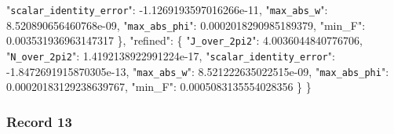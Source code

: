 \documentclass[
  10pt,
]{article}
\newenvironment{Shaded}{}{}
\newcommand{\DataTypeTok}[1]{\textcolor[rgb]{0.56,0.13,0.00}{#1}}
\newcommand{\FloatTok}[1]{\textcolor[rgb]{0.25,0.63,0.44}{#1}}
\newcommand{\FunctionTok}[1]{\textcolor[rgb]{0.02,0.16,0.49}{#1}}
\begin{document}
\begin{Shaded}
\begin{Highlighting}[]
    \DataTypeTok{"\nolinkurl{scalar_identity_error}"}\FunctionTok{:} \FloatTok{{-}1.1269193597016266e{-}11}\FunctionTok{,}
    \DataTypeTok{"\nolinkurl{max_abs_w}"}\FunctionTok{:} \FloatTok{8.520890656460768e{-}09}\FunctionTok{,}
    \DataTypeTok{"\nolinkurl{max_abs_phi}"}\FunctionTok{:} \FloatTok{0.0002018290985189379}\FunctionTok{,}
    \DataTypeTok{"min\_F"}\FunctionTok{:} \FloatTok{0.003531936963147317}
  \FunctionTok{\},}
  \DataTypeTok{"refined"}\FunctionTok{:} \FunctionTok{\{}
    \DataTypeTok{"\nolinkurl{J_over_2pi2}"}\FunctionTok{:} \FloatTok{4.0036044840776706}\FunctionTok{,}
    \DataTypeTok{"\nolinkurl{N_over_2pi2}"}\FunctionTok{:} \FloatTok{1.4192138922991224e{-}17}\FunctionTok{,}
    \DataTypeTok{"\nolinkurl{scalar_identity_error}"}\FunctionTok{:} \FloatTok{{-}1.8472691915870305e{-}13}\FunctionTok{,}
    \DataTypeTok{"\nolinkurl{max_abs_w}"}\FunctionTok{:} \FloatTok{8.521222635022515e{-}09}\FunctionTok{,}
    \DataTypeTok{"\nolinkurl{max_abs_phi}"}\FunctionTok{:} \FloatTok{0.00020183129238639767}\FunctionTok{,}
    \DataTypeTok{"min\_F"}\FunctionTok{:} \FloatTok{0.0005083135554028356}
  \FunctionTok{\}}
\FunctionTok{\}}
\end{Highlighting}
\end{Shaded}

\hypertarget{record-13}{%
\subsubsection{Record 13}\label{record-13}}
\end{document}
